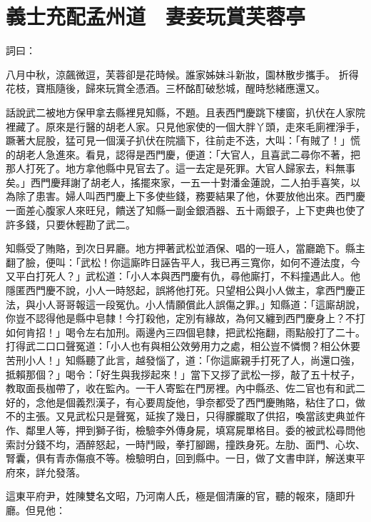 %

\chapter{義士充配孟州道　妻妾玩賞芙蓉亭}

詞曰：

八月中秋，涼飆微逗，芙蓉卻是花時候。誰家姊妹斗新妝，園林散步攜手。
折得花枝，寶瓶隨後，歸來玩賞全憑酒。三杯酩酊破愁城，醒時愁緒應還又。

話說武二被地方保甲拿去縣裡見知縣，不題。且表西門慶跳下樓窗，扒伏在人家院裡藏了。原來是行醫的胡老人家。只見他家使的一個大胖丫頭，走來毛廁裡淨手，蹶著大屁股，猛可見一個漢子扒伏在院牆下，往前走不迭，大叫：「有賊了！」慌的胡老人急進來。看見，認得是西門慶，便道：「大官人，且喜武二尋你不著，把那人打死了。地方拿他縣中見官去了。這一去定是死罪。大官人歸家去，料無事矣。」西門慶拜謝了胡老人，搖擺來家，一五一十對潘金蓮說，二人拍手喜笑，以為除了患害。婦人叫西門慶上下多使些錢，務要結果了他，休要放他出來。西門慶一面差心腹家人來旺兒，饋送了知縣一副金銀酒器、五十兩銀子，上下吏典也使了許多錢，只要休輕勘了武二。

知縣受了賄賂，到次日昇廳。地方押著武松並酒保、唱的一班人，當廳跪下。縣主翻了臉，便叫：「武松！你這廝昨日誣告平人，我已再三寬你，如何不遵法度，今又平白打死人？」武松道：「小人本與西門慶有仇，尋他廝打，不料撞遇此人。他隱匿西門慶不說，小人一時怒起，誤將他打死。只望相公與小人做主，拿西門慶正法，與小人哥哥報這一段冤仇。小人情願償此人誤傷之罪。」知縣道：「這廝胡說，你豈不認得他是縣中皂隸！今打殺他，定別有緣故，為何又纏到西門慶身上？不打如何肯招！」喝令左右加刑。兩邊內三四個皂隸，把武松拖翻，雨點般打了二十。打得武二口口聲冤道：「小人也有與相公效勞用力之處，相公豈不憐憫？相公休要苦刑小人！」知縣聽了此言，越發惱了，道：「你這廝親手打死了人，尚還口強，抵賴那個？」喝令：「好生與我拶起來！」當下又拶了武松一拶，敲了五十杖子，教取面長枷帶了，收在監內。一干人寄監在門房裡。內中縣丞、佐二官也有和武二好的，念他是個義烈漢子，有心要周旋他，爭奈都受了西門慶賄賂，粘住了口，做不的主張。又見武松只是聲冤，延挨了幾日，只得朦朧取了供招，喚當該吏典並仵作、鄰里人等，押到獅子街，檢驗李外傳身屍，填寫屍單格目。委的被武松尋問他索討分錢不均，酒醉怒起，一時鬥毆，拳打腳踢，撞跌身死。左肋、面門、心坎、腎囊，俱有青赤傷痕不等。檢驗明白，回到縣中。一日，做了文書申詳，解送東平府來，詳允發落。

這東平府尹，姓陳雙名文昭，乃河南人氏，極是個清廉的官，聽的報來，隨即升廳。但見他：

